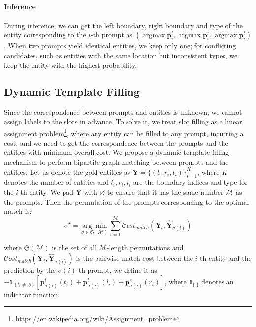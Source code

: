 \documentclass[11pt]{article}
\begin{document}
\paragraph{Inference} During inference, we can get the left boundary, right boundary and type of the entity corresponding to the $i$-th prompt as $\left(\operatorname{argmax}\mathbf{p}^{l}_{i},\operatorname{argmax}\mathbf{p}^{r}_{i},\operatorname{argmax}\mathbf{p}^{t}_{i}\right)$. When two prompts yield identical entities, we keep only one; for conflicting candidates, such as entities with the same location but inconsistent types, we keep the entity with the highest probability. 



\subsection{Dynamic Template Filling}
\label{3.4}

Since the correspondence between prompts and entities is unknown, we cannot assign labels to the slots in advance.
To solve it, we treat slot filling as a linear assignment problem\footnote{\;\url{https://en.wikipedia.org/wiki/Assignment_problem}}, where any entity can be filled to any prompt, incurring a cost, and we need to get the correspondence between the prompts and the entities with minimum overall cost. We propose a dynamic template filling mechanism to perform bipartite graph matching between prompts and the entities.
Let us denote the gold entities as $\mathbf{Y} = \{(l_i,r_i,t_i)\}^K_{i=1}$, where $K$ denotes the number of entities and $l_i,r_i,t_i$ are the boundary indices and type for the $i$-th entity. We pad $\mathbf{Y}$ with $\varnothing$ to ensure that it has the same number $\mathcal{M}$ as the prompts. Then the permutation of the prompts corresponding to the optimal match is:
\begin{equation*}
\label{cost}
\sigma^{\star}=\underset{\sigma \in \mathfrak{S}(\mathcal{M})}{\arg \min } \sum_{i=1}^{\mathcal{M}} \mathcal{C}ost_{m a t c h}\left(\mathbf{Y}_{i}, \hat{\mathbf{Y}}_{\sigma(i)}\right)
\end{equation*}

\noindent where $\mathfrak{S}(\mathcal{M})$ is the set of all $\mathcal{M}$-length permutations and  $\mathcal{C}ost_{m a t c h}\left(\mathbf{Y}_{i}, \hat{\mathbf{Y}}_{\sigma(i)}\right)$ is the pairwise match cost between the $i$-th entity and the prediction by the $\sigma(i)$-th prompt, we define it as $-\mathds{1}_{\left\{t_{i} \neq \varnothing\right\}} \left[ \mathbf{p}^{t}_{\sigma(i)}\left(t_{i}\right) + \mathbf{p}^{l}_{\sigma(i)}\left(l_{i}\right) + \mathbf{p}^{r}_{\sigma(i)}\left(r_{i}\right) \right]$, where $\mathds{1}_{\{\cdot\}}$ denotes an indicator function. 
\end{document}
